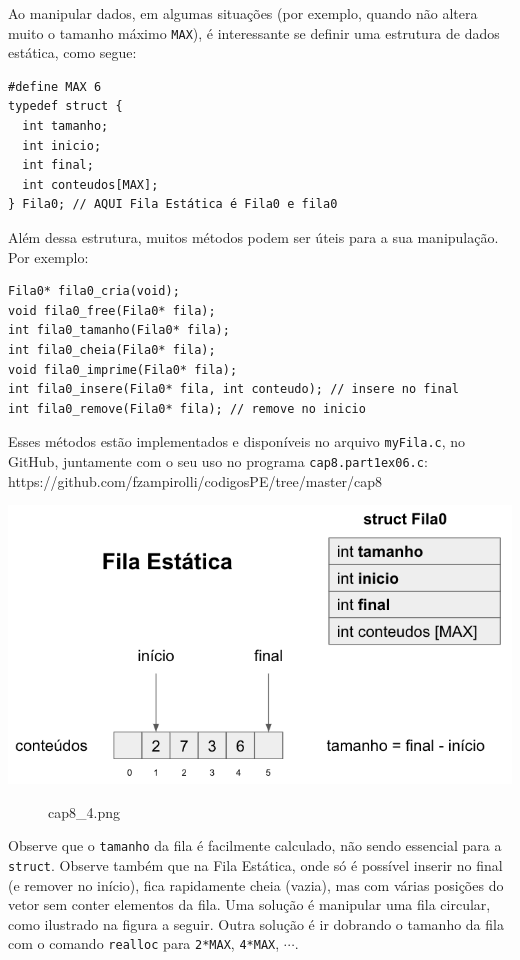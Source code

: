 \documentclass[12pt,a4paper]{article}
\begin{document}
    Ao manipular dados, em algumas situações (por exemplo, quando não altera
muito o tamanho máximo \texttt{MAX}), é interessante se definir uma
estrutura de dados estática, como segue:

\begin{verbatim}
#define MAX 6
typedef struct {
  int tamanho;
  int inicio;
  int final;
  int conteudos[MAX];
} Fila0; // AQUI Fila Estática é Fila0 e fila0
\end{verbatim}

Além dessa estrutura, muitos métodos podem ser úteis para a sua
manipulação. Por exemplo:

\begin{verbatim}
Fila0* fila0_cria(void);
void fila0_free(Fila0* fila);
int fila0_tamanho(Fila0* fila);
int fila0_cheia(Fila0* fila);
void fila0_imprime(Fila0* fila);
int fila0_insere(Fila0* fila, int conteudo); // insere no final
int fila0_remove(Fila0* fila); // remove no inicio
\end{verbatim}

Esses métodos estão implementados e disponíveis no arquivo
\texttt{myFila.c}, no GitHub, juntamente com o seu uso no programa
\texttt{cap8.part1ex06.c}:
https://github.com/fzampirolli/codigosPE/tree/master/cap8

\includegraphics{"figs/cap8_4.png"}

    \begin{figure}
\centering
\caption{cap8\_4.png}
\end{figure}

    Observe que o \texttt{tamanho} da fila é facilmente calculado, não sendo
essencial para a \texttt{struct}. Observe também que na Fila Estática,
onde só é possível inserir no final (e remover no início), fica
rapidamente cheia (vazia), mas com várias posições do vetor sem conter
elementos da fila. Uma solução é manipular uma fila circular, como
ilustrado na figura a seguir. Outra solução é ir dobrando o tamanho da
fila com o comando \texttt{realloc} para \texttt{2*MAX}, \texttt{4*MAX},
\(\cdots\).
\end{document}
